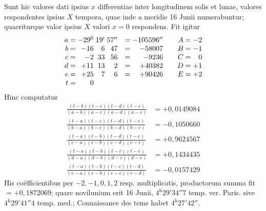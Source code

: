 Sunt hic valores dati ipsius \(x\) differentiae inter longitudinem solis et lunae, valores respondentes ipsius \(X\) tempora, quae inde a meridie 16 Junii numerabuntur; quaeriturque valor ipsius \(X\) valori \(x=0\) respondens. Fit igitur
\[
\begin{array}{r@{\;}c@{\;}r@{\;}r@{\;}r@{\quad}c@{\;}r@{\qquad}r@{\;}c@{\;}r}
a&=&-29^{0}&19'&57''&=&-105596''&A&=&-2\\
b&=&-16&6&47&=&-58007&B&=&-1\\
c&=&-2&33&56&=&-9236&C&=&0\\
d&=&+11&13&2&=&+40382&D&=&+1\\
e&=&+25&7&6&=&+90426&E&=&+2\\
t&=&0&&&&&&&
\end{array}
\]
Hinc computatur
\[
\begin{aligned}
\frac{(t-b)(t-c)(t-d)(t-e)}{(a-b)(a-c)(a-d)(a-e)}&=+0{,}0149084\\[5pt]
\frac{(t-a)(t-c)(t-d)(t-e)}{(b-a)(b-c)(b-d)(b-e)}&=-0{,}1050660\\[5pt]
\frac{(t-a)(t-b)(t-d)(t-e)}{(c-a)(c-b)(c-d)(c-e)}&=+0{,}9624567\\[5pt]
\frac{(t-a)(t-b)(t-c)(t-e)}{(d-a)(d-b)(d-c)(d-e)}&=+0{,}1434435\\[5pt]
\frac{(t-a)(t-b)(t-c)(t-d)}{(e-a)(e-b)(e-c)(e-d)}&=-0{,}0157429
\end{aligned}
\]
His coëfficientibus per \(-2,-1,0,1,2\) resp. multiplicatis, productorum summa
fit \(=+0{,}1872069\); quare novilunium erit 16 Junii, \(4^{\mathrm h}29'34''7\) temp. ver.
Paris. sive \(4^{\mathrm h}29'41''4\) temp. med.; Connaissance des tems habet \(4^{\mathrm h}27'42''\).

